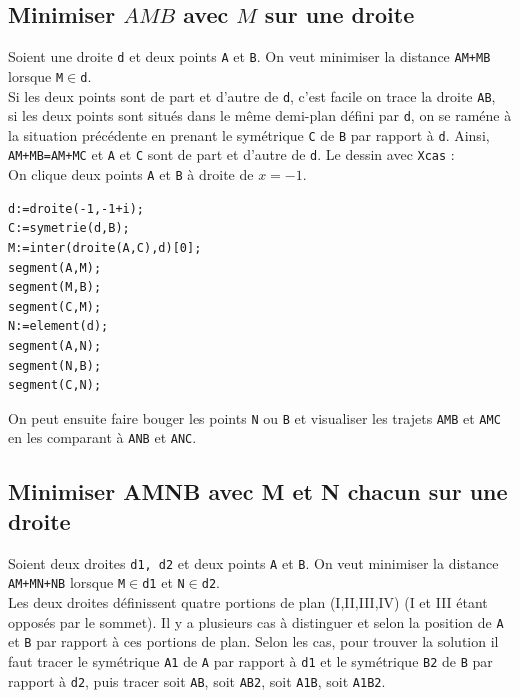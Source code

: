 \documentclass[a4paper,11pt]{book}
\begin{document}
\subsection{Minimiser $AMB$  avec $M$ sur une droite}
Soient une droite {\tt d} et deux points {\tt A} et {\tt B}. On veut 
minimiser la distance {\tt AM+MB} lorsque {\tt M}$\in${\tt d}.\\
Si les deux points sont de part et d'autre de {\tt d}, c'est facile on trace 
la droite {\tt AB},\\
si les deux points sont  situ\'es 
dans le m\^eme demi-plan d\'efini par {\tt d}, on se ram\'ene \` a la 
situation pr\'ec\'edente en prenant le sym\'etrique {\tt C} de {\tt B} par
rapport \`a {\tt d}. 
Ainsi, {\tt AM+MB=AM+MC} et {\tt A} et {\tt C} sont de part et d'autre 
de {\tt d}.
Le dessin avec {\tt Xcas} :\\
On clique deux points {\tt A} et {\tt B} \`a droite 
de $x=-1$.
\begin{verbatim}
d:=droite(-1,-1+i);
C:=symetrie(d,B);
M:=inter(droite(A,C),d)[0];
segment(A,M);
segment(M,B);
segment(C,M);
N:=element(d);
segment(A,N);
segment(N,B);
segment(C,N);
\end{verbatim}
On peut ensuite faire bouger les points {\tt N} ou {\tt B} et visualiser les 
trajets {\tt AMB} et {\tt AMC} en les comparant \`a {\tt ANB} et {\tt ANC}.  
\subsection{Minimiser AMNB avec M et N chacun sur une droite}
Soient deux droites {\tt d1, d2} et deux points {\tt A} et {\tt B}. On veut 
minimiser la distance {\tt AM+MN+NB} lorsque {\tt M}$\in${\tt d1} et 
{\tt N}$\in${\tt d2}.\\
Les deux droites d\'efinissent quatre portions de plan (I,II,III,IV) 
(I et III \'etant oppos\'es par le sommet). 
Il y a plusieurs cas \`a distinguer et selon la position de {\tt A} et {\tt B}
par rapport \`a ces portions de plan. Selon les cas, pour trouver la solution 
il faut tracer  le sym\'etrique {\tt A1} de {\tt A} par
rapport \`a {\tt d1} et le sym\'etrique {\tt B2} de {\tt B} par
rapport \`a {\tt d2}, puis tracer soit {\tt AB}, soit {\tt AB2},
soit {\tt A1B}, soit {\tt A1B2}. 
\end{document}
